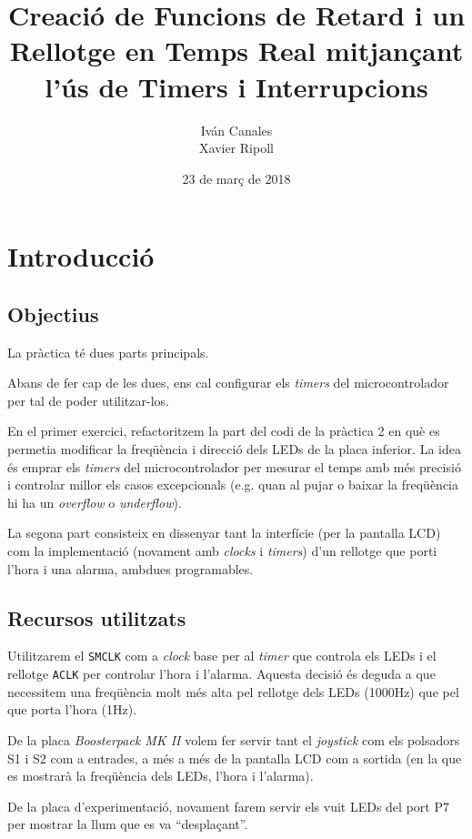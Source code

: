 \documentclass{../pdae} %
\title{Creació de Funcions de Retard i un Rellotge en Temps Real mitjançant
l’ús de Timers i Interrupcions}
\author{
    Iván Canales\\
    Xavier Ripoll
}
\date{23 de març de 2018}
\begin{document}
\maketitle

\section{Introducció}

\subsection{Objectius}

La pràctica té dues parts principals.

Abans de fer cap de les dues, ens cal configurar els \textit{timers} del
microcontrolador per tal de poder utilitzar-los.

En el primer exercici, refactoritzem la part del
codi de la pràctica 2 en què es permetia modificar la freqüència i direcció
dels LEDs de la placa inferior. La idea és emprar els \textit{timers} del
microcontrolador per mesurar el temps amb més precisió i controlar millor
els casos excepcionals (e.g. quan al pujar o baixar la freqüència hi ha un
\textit{overflow} o \textit{underflow}).

La segona part consisteix en dissenyar tant la interfície (per la pantalla LCD)
com la implementació (novament amb \textit{clocks} i \textit{timers}) d'un
rellotge que porti l'hora i una alarma, ambdues programables.


\subsection{Recursos utilitzats}
Utilitzarem el \texttt{SMCLK} com a \textit{clock} base per al \textit{timer}
que controla els LEDs i el rellotge \texttt{ACLK} per controlar l'hora i
l'alarma. Aquesta decisió és deguda a que necessitem una freqüència molt més alta
pel rellotge dels LEDs (1000Hz) que pel que porta l'hora (1Hz).

De la placa \textit{Boosterpack MK II} volem fer servir tant el
\textit{joystick} com els polsadors S1 i S2 com a entrades, a més a més de la
pantalla LCD com a sortida (en la que es mostrarà la freqüència dels LEDs,
l'hora i l'alarma).

De la placa d'experimentació, novament farem servir els vuit LEDs del port P7
per mostrar la llum que es va ``desplaçant''.
\end{document}

